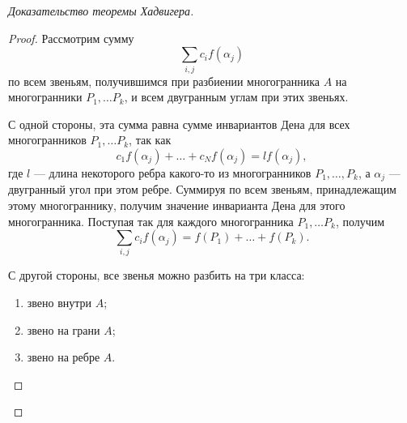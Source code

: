 \begin{proof}[Доказательство теоремы Хадвигера]
\begin{proof}
    Рассмотрим сумму
    \[\sum_{i,j} c_i f(\alpha_j)\]
    по всем звеньям, получившимся при разбиении многогранника $A$ на многогранники $P_1, \dots P_k$, и всем двугранным углам при этих звеньях.

    С одной стороны, эта сумма равна сумме инвариантов Дена для всех многогранников $P_1, \dots P_k$, так как 
    \[c_1 f(\alpha_j) + \dots + c_N f(\alpha_j) = l f(\alpha_j),\]
    где $l$ — длина некоторого ребра какого-то из многогранников $P_1, \dots, P_k$, а $\alpha_j$ — двугранный угол при этом ребре. Суммируя по всем звеньям, принадлежащим этому многограннику, получим значение инварианта Дена для этого многогранника. Поступая так для каждого многогранника $P_1, \dots P_k$, получим
    \[\sum_{i,j} c_i f(\alpha_j) = f(P_1) + \dots + f(P_k).\]

    С другой стороны, все звенья можно разбить на три класса:
    \begin{enumerate}
        \item звено внутри $A$;
        \item звено на грани $A$;
        \item звено на ребре $A$.
    \end{enumerate}
    

\end{proof}
\end{proof}
